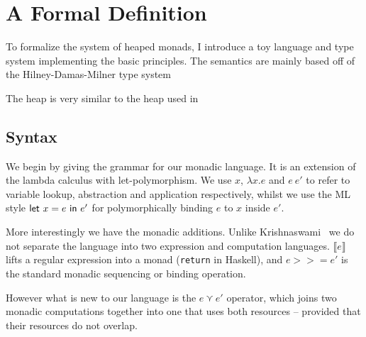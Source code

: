\chapter{A Formal Definition}

To formalize the system of heaped monads, I introduce a toy language
and type system implementing the basic principles. The semantics are
mainly based off of the Hilney-Damas-Milner type system \cite{damasmilner}

The heap is very similar to the heap used in \cite{krishnaswami}

\section{Syntax}

\newcommand{\IO}{\mathsf{IO}}
\newcommand{\bind}{>\!\!>\!\!=} \newcommand{\concbind}{>\!\!>\!>\!\!=}
\newcommand{\subtyp}{\geq:}
\newcommand{\notsubtyp}{\ngeq:}
\newcommand{\lift}[1]{\ensuremath{\llbracket#1\rrbracket}}

\setlength{\grammarparsep}{20pt plus 1pt minus 1pt} %
\setlength{\grammarindent}{12em} %
\renewcommand{\syntleft}{}
\renewcommand{\syntright}{}


\def\defaultHypSeparation{\hskip .05in}

We begin by giving the grammar for our monadic language.
It is an extension of the lambda calculus with let-polymorphism.
We use $x$, $\lambda x . e$ and $e \ e'$ to refer to variable lookup,
abstraction and application respectively, whilst we use the ML style
$\mathsf{let} \ x = e \ \mathsf{in} \ e'$ for polymorphically binding $e$ to $x$ inside
$e'$.

More interestingly we have the monadic additions. Unlike
Krishnaswami~\cite{krishnaswami2006} we do not separate the language
into two expression and computation languages.
$\llbracket e \rrbracket$ lifts a regular expression into a monad (\texttt{return} in Haskell), and $e \bind e'$ is
the standard monadic sequencing or binding operation.

However what is new to our language is the $e \curlyvee e'$ operator, which
joins two monadic computations together into one that uses both
resources -- provided that their resources do not overlap.

